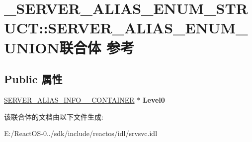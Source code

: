 \hypertarget{union___s_e_r_v_e_r___a_l_i_a_s___e_n_u_m___s_t_r_u_c_t_1_1_s_e_r_v_e_r___a_l_i_a_s___e_n_u_m___u_n_i_o_n}{}\section{\+\_\+\+S\+E\+R\+V\+E\+R\+\_\+\+A\+L\+I\+A\+S\+\_\+\+E\+N\+U\+M\+\_\+\+S\+T\+R\+U\+CT\+:\+:S\+E\+R\+V\+E\+R\+\_\+\+A\+L\+I\+A\+S\+\_\+\+E\+N\+U\+M\+\_\+\+U\+N\+I\+O\+N联合体 参考}
\label{union___s_e_r_v_e_r___a_l_i_a_s___e_n_u_m___s_t_r_u_c_t_1_1_s_e_r_v_e_r___a_l_i_a_s___e_n_u_m___u_n_i_o_n}
\subsection*{Public 属性}
\begin{DoxyCompactItemize}
\item 
\mbox{\label{union___s_e_r_v_e_r___a_l_i_a_s___e_n_u_m___s_t_r_u_c_t_1_1_s_e_r_v_e_r___a_l_i_a_s___e_n_u_m___u_n_i_o_n_a7999e7a1e71b9cb1201b259f7e0c3a3b}} 
\hyperlink{struct___s_e_r_v_e_r___a_l_i_a_s___i_n_f_o__0___c_o_n_t_a_i_n_e_r}{S\+E\+R\+V\+E\+R\+\_\+\+A\+L\+I\+A\+S\+\_\+\+I\+N\+F\+O\+\_\+\_\+\+C\+O\+N\+T\+A\+I\+N\+ER} $\ast$ {\bfseries Level0}
\end{DoxyCompactItemize}


该联合体的文档由以下文件生成\+:\begin{DoxyCompactItemize}
\item 
E\+:/\+React\+O\+S-\/0../sdk/include/reactos/idl/srvsvc.\+idl\end{DoxyCompactItemize}
